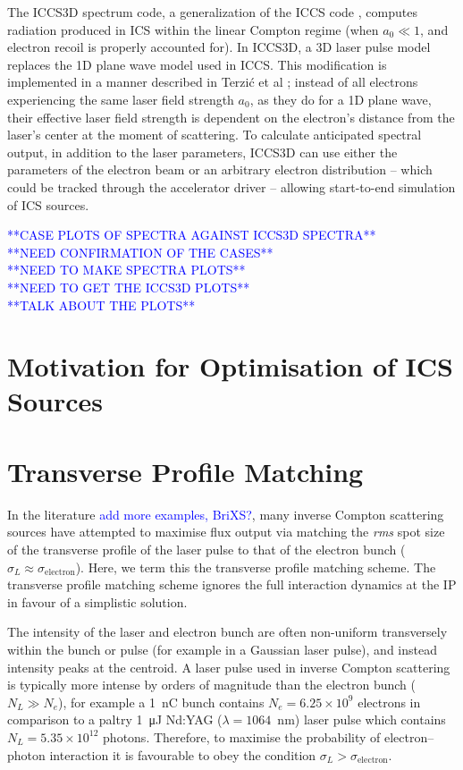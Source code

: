 \documentclass[../main.tex]{subfiles}
\begin{document}
The \textsc{ICCS3D} spectrum code, a generalization of the \textsc{ICCS} code \cite{krafft2016laser,ranjan2018simulation}, computes radiation produced in ICS within the linear Compton regime (when $a_{0}\ll 1$, and electron recoil is properly accounted for). In \textsc{ICCS3D}, a 3D laser pulse model replaces the 1D plane wave model used in \textsc{ICCS}. This modification is implemented in a manner described in Terzi\'c et al \cite{terzic2019improving}; instead of all electrons experiencing the same laser field strength $a_{0}$, as they do for a 1D plane wave, their effective laser field strength is dependent on the electron's distance from the laser's center at the moment of scattering. To calculate anticipated spectral output, in addition to the laser parameters, \textsc{ICCS3D} can use either the parameters of the electron beam or an arbitrary electron distribution -- which could be tracked through the accelerator driver -- allowing start-to-end simulation of ICS sources. 

\textcolor{blue}{**CASE PLOTS OF SPECTRA AGAINST ICCS3D SPECTRA** \\ **NEED CONFIRMATION OF THE CASES** \\ **NEED TO MAKE SPECTRA PLOTS** \\ **NEED TO GET THE ICCS3D PLOTS** \\ **TALK ABOUT THE PLOTS**}

\section{Motivation for Optimisation of ICS Sources}

\section{Transverse Profile Matching}
\label{sec:transverse_profile_matching}

In the literature \cite{akagi2016narrow,deitrick2018high,jacquet2015radiation} \textcolor{blue}{add more examples, BriXS?}, many inverse Compton scattering sources have attempted to maximise flux output via matching the \textit{rms} spot size of the transverse profile of the laser pulse to that of the electron bunch ($\sigma_{L}\approx\sigma_{\mathrm{electron}}$). Here, we term this the transverse profile matching scheme. The transverse profile matching scheme ignores the full interaction dynamics at the IP in favour of a simplistic solution. 

The intensity of the laser and electron bunch are often non-uniform transversely within the bunch or pulse (for example in a Gaussian laser pulse), and instead intensity peaks at the centroid. A laser pulse used in inverse Compton scattering is typically more intense by orders of magnitude than the electron bunch ($N_{L} \gg N_{e}$), for example a 1~\si{\nano\coulomb} bunch contains $N_{e} = 6.25\times 10^{9}$ electrons in comparison to a paltry 1~\si{\micro\joule} Nd:YAG ($\lambda = 1064$~\si{\nano\meter}) laser pulse which contains $N_{L} = 5.35\times 10^{12}$ photons. Therefore, to maximise the probability of electron--photon interaction it is favourable to obey the condition $\sigma_{L} > \sigma_{\mathrm{electron}}$.
\end{document}
